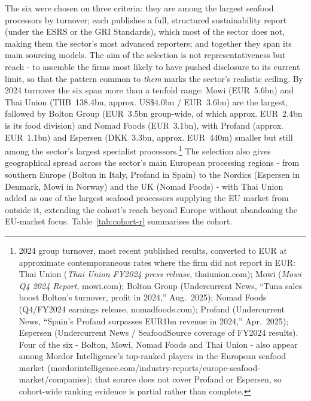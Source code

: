 The six were chosen on three criteria: they are among the largest seafood
processors by turnover; each publishes a full, structured sustainability report
(under the ESRS or the GRI Standards), which most of the sector does not, making
them the sector's most advanced reporters; and together they span its main
sourcing models. The aim of the selection is not representativeness but reach -
to assemble the firms most likely to have pushed disclosure to its current limit,
so that the pattern common to \emph{them} marks the sector's realistic ceiling.
By 2024 turnover the six span more than a tenfold range: Mowi (EUR~5.6bn) and
Thai Union (THB~138.4bn, approx. US\$4.0bn / EUR~3.6bn) are the largest, followed
by Bolton Group (EUR~3.5bn group-wide, of which approx. EUR~2.4bn is its food
division) and Nomad Foods (EUR~3.1bn), with Profand (approx. EUR~1.1bn) and
Espersen (DKK~3.3bn, approx. EUR~440m) smaller but still among the sector's
largest specialist processors.\footnote{2024 group turnover, most recent
published results, converted to EUR at approximate contemporaneous rates where
the firm did not report in EUR: Thai Union (\emph{Thai Union FY2024 press
release}, thaiunion.com); Mowi (\emph{Mowi Q4 2024 Report}, mowi.com); Bolton
Group (Undercurrent News, ``Tuna sales boost Bolton's turnover, profit in
2024,'' Aug.\ 2025); Nomad Foods (Q4/FY2024 earnings release, nomadfoods.com);
Profand (Undercurrent News, ``Spain's Profand surpasses EUR1bn revenue in
2024,'' Apr.\ 2025); Espersen (Undercurrent News / SeafoodSource coverage of
FY2024 results). Four of the six - Bolton, Mowi, Nomad Foods and Thai Union - also appear among Mordor Intelligence's top-ranked players in the European
seafood market (mordorintelligence.com/industry-reports/europe-seafood-market/companies);
that source does not cover Profand or Espersen, so cohort-wide ranking evidence
is partial rather than complete.} The selection also gives geographical
spread across the sector's main European processing regions - from southern
Europe (Bolton in Italy, Profand in Spain) to the Nordics (Espersen in
Denmark, Mowi in Norway) and the UK (Nomad Foods) - with Thai Union added
as one of the largest seafood processors supplying the EU market from
outside it, extending the cohort's reach beyond Europe without abandoning
the EU-market focus.
Table~\ref{tab:cohort-r} summarises the cohort.
